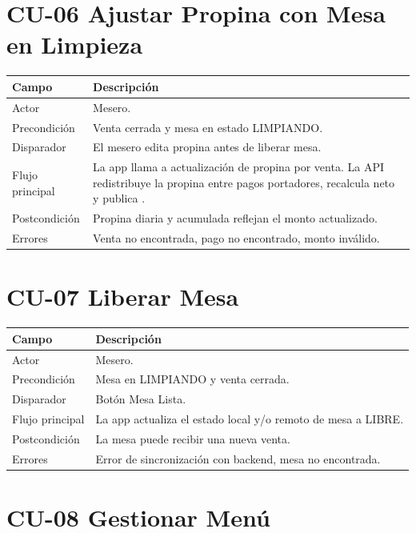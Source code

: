 \documentclass[11pt,letterpaper,openany]{report}
\newcommand{\code}[1]{\texttt{\detokenize{#1}}}
\begin{document}
\section{CU-06 Ajustar Propina con Mesa en Limpieza}

\begin{longtable}{p{}p{}}
\toprule
\textbf{Campo} & \textbf{Descripción}\\
\midrule
Actor & Mesero.\\
Precondición & Venta cerrada y mesa en estado LIMPIANDO.\\
Disparador & El mesero edita propina antes de liberar mesa.\\
Flujo principal & La app llama a actualización de propina por venta. La API redistribuye la propina entre pagos portadores, recalcula neto y publica \code{/topic/propinas}.\\
Postcondición & Propina diaria y acumulada reflejan el monto actualizado.\\
Errores & Venta no encontrada, pago no encontrado, monto inválido.\\
\bottomrule
\end{longtable}

\section{CU-07 Liberar Mesa}

\begin{longtable}{p{}p{}}
\toprule
\textbf{Campo} & \textbf{Descripción}\\
\midrule
Actor & Mesero.\\
Precondición & Mesa en LIMPIANDO y venta cerrada.\\
Disparador & Botón Mesa Lista.\\
Flujo principal & La app actualiza el estado local y/o remoto de mesa a LIBRE.\\
Postcondición & La mesa puede recibir una nueva venta.\\
Errores & Error de sincronización con backend, mesa no encontrada.\\
\bottomrule
\end{longtable}

\section{CU-08 Gestionar Menú}
\end{document}
